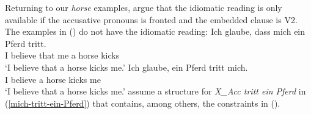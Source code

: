Returning to our \emph{horse} examples, \citet[]{RS2009a} argue that the idiomatic reading
is only available if the accusative pronouns is fronted and the embedded clause is V2. The examples
in () do not have the idiomatic reading:
\eal
\ex 
\gll Ich glaube, dass mich ein Pferd tritt.\\
     I believe   that me   a horse   kicks\\
\glt `I believe that a horse kicks me.'
\ex 
\gll Ich glaube, ein Pferd tritt mich.\\
     I believe   a horse   kicks me\\
\glt `I believe that a horse kicks me.'
\zl
\citeauthor{RS2009a} assume a structure for \emph{X\_Acc tritt ein Pferd} in (\ref{mich-tritt-ein-Pferd}) that contains, among others,
the constraints in ().

